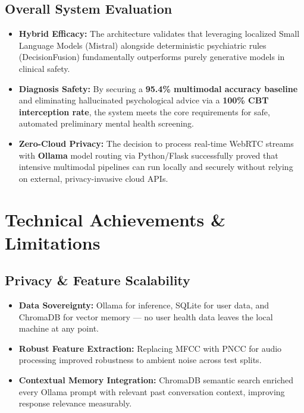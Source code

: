 \documentclass[11pt]{report}
\begin{document}
\subsection{Overall System Evaluation}
\begin{itemize}
    \item \textbf{Hybrid Efficacy:} The architecture validates that leveraging localized Small Language Models (Mistral) alongside deterministic psychiatric rules (DecisionFusion) fundamentally outperforms purely generative models in clinical safety.
    \item \textbf{Diagnosis Safety:} By securing a \textbf{95.4\% multimodal accuracy baseline} and eliminating hallucinated psychological advice via a \textbf{100\% CBT interception rate}, the system meets the core requirements for safe, automated preliminary mental health screening.
    \item \textbf{Zero-Cloud Privacy:} The decision to process real-time WebRTC streams with \textbf{Ollama} model routing via Python/Flask successfully proved that intensive multimodal pipelines can run locally and securely without relying on external, privacy-invasive cloud APIs.
\end{itemize}

\section{Technical Achievements \& Limitations}

\subsection{Privacy \& Feature Scalability}
\begin{itemize}
    \item \textbf{Data Sovereignty:} Ollama for inference, SQLite for user data, and ChromaDB for vector memory — no user health data leaves the local machine at any point.
    \item \textbf{Robust Feature Extraction:} Replacing MFCC with PNCC for audio processing improved robustness to ambient noise across test splits.
    \item \textbf{Contextual Memory Integration:} ChromaDB semantic search enriched every Ollama prompt with relevant past conversation context, improving response relevance measurably.
\end{itemize}
\end{document}
